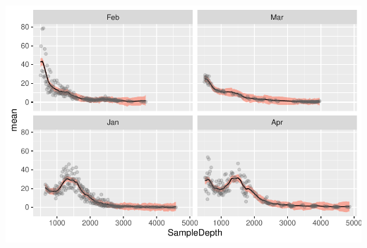 \documentclass[
  letterpaper,
  DIV=11,
  numbers=noendperiod]{scrartcl}
\begin{document}
\begin{tcolorbox}
\begin{center}
\includegraphics{day1_practical_2_files/figure-pdf/unnamed-chunk-47-1.pdf}
\end{center}

\end{tcolorbox}
\end{document}
